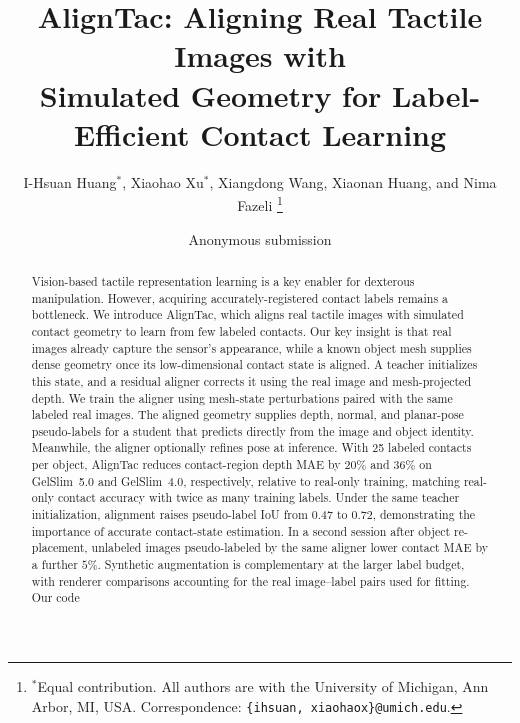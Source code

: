 \documentclass[letterpaper,10pt,conference]{ieeeconf}
\title{\LARGE\bf AlignTac: Aligning Real Tactile Images
with\\ Simulated Geometry for Label-Efficient Contact Learning}
\author{I-Hsuan Huang$^{*}$, Xiaohao Xu$^{*}$, Xiangdong Wang, Xiaonan Huang, and Nima Fazeli%
\thanks{$^{*}$Equal contribution. All authors are with the University of Michigan, Ann Arbor, MI, USA.
Correspondence: \texttt{\{ihsuan, xiaohaox\}@umich.edu}.}%
}
\author{Anonymous submission}
\begin{document}
\maketitle
\thispagestyle{empty}
\pagestyle{empty}\raggedbottom

\begin{abstract}
Vision-based tactile representation learning is a key enabler for dexterous manipulation. However, acquiring accurately-registered contact labels remains a bottleneck. We introduce AlignTac, which aligns real tactile images with simulated contact geometry to learn from few labeled contacts. Our key insight is that real images already capture the sensor's appearance, while a known object mesh supplies dense geometry once its low-dimensional contact state is aligned. A teacher initializes this state, and a residual aligner corrects it using the real image and mesh-projected depth. We train the aligner using mesh-state perturbations paired with the same labeled real images. The aligned geometry supplies depth, normal, and planar-pose pseudo-labels for a student that predicts directly from the image and object identity. Meanwhile, the aligner optionally refines pose at inference. With 25 labeled contacts per object, AlignTac reduces contact-region depth MAE by $20\%$ and $36\%$ on GelSlim~5.0 and GelSlim~4.0, respectively, relative to real-only training, matching real-only contact accuracy with twice as many training labels. Under the same teacher initialization, alignment raises pseudo-label IoU from $0.47$ to $0.72$, demonstrating the importance of accurate contact-state estimation. In a second session after object re-placement, unlabeled images pseudo-labeled by the same aligner lower contact MAE by a further $5\%$. Synthetic augmentation is complementary at the larger label budget, with renderer comparisons accounting for the real image–label pairs used for fitting. Our code 
\end{abstract}










\end{document}
